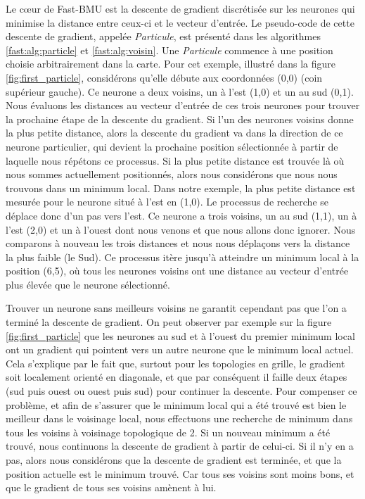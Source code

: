 	Le cœur de Fast-BMU est la descente de gradient discrétisée sur les neurones qui minimise la distance entre ceux-ci et le vecteur d'entrée. Le pseudo-code de cette descente de gradient, appelée \textit{Particule}, est présenté dans les algorithmes \ref{fast:alg:particle} et \ref{fast:alg:voisin}. Une \textit{Particule} commence à une position choisie arbitrairement dans la carte. Pour cet exemple, illustré dans la figure \ref{fig:first_particle}, considérons qu'elle débute aux coordonnées (0,0) (coin supérieur gauche). Ce neurone a deux voisins, un à l'est (1,0) et un au sud (0,1). Nous évaluons les distances au vecteur d'entrée de ces trois neurones pour trouver la prochaine étape de la descente du gradient. Si l'un des neurones voisins donne la plus petite distance, alors la descente du gradient va dans la direction de ce neurone particulier, qui devient la prochaine position sélectionnée à partir de laquelle nous répétons ce processus. Si la plus petite distance est trouvée là où nous sommes actuellement positionnés, alors nous considérons que nous nous trouvons dans un minimum local. Dans notre exemple, la plus petite distance est mesurée pour le neurone situé à l'est en (1,0). Le processus de recherche se déplace donc d'un pas vers l'est. Ce neurone a trois voisins, un au sud (1,1), un à l'est (2,0) et un à l'ouest dont nous venons et que nous allons donc ignorer. Nous comparons à nouveau les trois distances et nous nous déplaçons vers la distance la plus faible (le Sud). Ce processus itère jusqu'à atteindre un minimum local à la position (6,5), où tous les neurones voisins ont une distance au vecteur d'entrée plus élevée que le neurone sélectionné.

	Trouver un neurone sans meilleurs voisins ne garantit cependant pas que l'on a terminé la descente de gradient. On peut observer par exemple sur la figure \ref{fig:first_particle} que les neurones au sud et à l'ouest du premier minimum local ont un gradient qui pointent vers un autre neurone que le minimum local actuel. Cela s'explique par le fait que, surtout pour les topologies en grille, le gradient soit localement orienté en diagonale, et que par conséquent il faille deux étapes (sud puis ouest ou ouest puis sud) pour continuer la descente. Pour compenser ce problème, et afin de s'assurer que le minimum local qui a été trouvé est bien le meilleur dans le voisinage local, nous effectuons une recherche de minimum dans tous les voisins à voisinage topologique de 2. Si un nouveau minimum a été trouvé, nous continuons la descente de gradient à partir de celui-ci. Si il n'y en a pas, alors nous considérons que la descente de gradient est terminée, et que la position actuelle est le minimum trouvé. Car tous ses voisins sont moins bons, et que le gradient de tous ses voisins amènent à lui.

